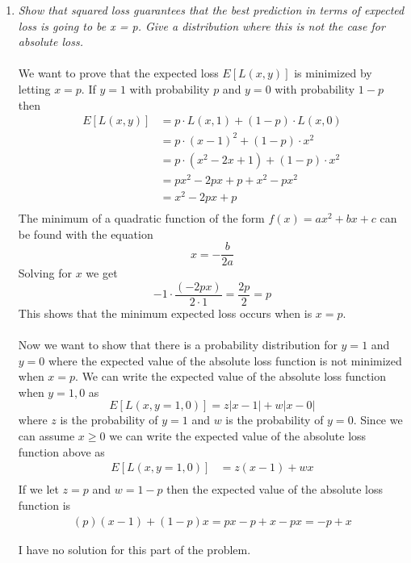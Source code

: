 \documentclass[12pt]{article}
\begin{document}
\begin{enumerate}
  \newpage
  \item \textit{Show that squared loss guarantees that the best prediction
  in terms of expected loss is going to be x = p.  Give a distribution where
  this is not the case for absolute loss.}\\
  \\
  We want to prove that the expected loss $E[L(x,y)]$ is minimized by letting
  $x=p$.  If $y = 1$ with probability $p$ and $y = 0$ with probability $1-p$
  then 
  \begin{align*}
  E[L(x,y)] &= p \cdot L(x,1) + (1-p) \cdot L(x,0)\\
  &= p \cdot (x-1)^2 + (1-p) \cdot x^2\\
  &= p \cdot (x^2 - 2x + 1) + (1-p)\cdot x^2\\
  &= px^2 - 2px + p + x^2 - px^2\\
  & = x^2 - 2px + p\\
  \end{align*}
  The minimum of a quadratic function of the form $f(x) = ax^2 + bx +c$ can be
  found with the equation 
  $$
  x = -\frac{b}{2a}
  $$
  Solving for $x$ we get 
  $$
  -1 \cdot \frac{(-2px)}{2 \cdot 1} = \frac{2p}{2} = p
  $$
  This shows that the minimum expected loss occurs when is $x=p$.\\
  \\
  Now we want to show that there is a probability distribution for $y=1$ and
  $y=0$ where the expected value of the absolute loss function is not minimized
  when $x=p$.  We can write the expected value of the absolute loss function
  when $y=1,0$ as $$
  E[L(x,y=1,0)] = z|x-1| + w|x-0|
  $$
  where $z$ is the probability of $y=1$ and $w$ is the probability of $y=0$. 
  Since we can assume $x \ge 0$ we can write the expected value of the
  absolute loss function above as
  \begin{align*}
  E[L(x,y=1,0)] &= z(x-1) + wx\\
  \end{align*}
  If we let $z=p$ and $w=1-p$ then the expected value of the absolute
  loss function is
  \begin{align}
  (p)(x-1) + (1-p)x = px - p + x -px = -p + x 
  \end{align}
  
  I have no solution for this part of the problem.
  

\end{enumerate}
\end{document}
